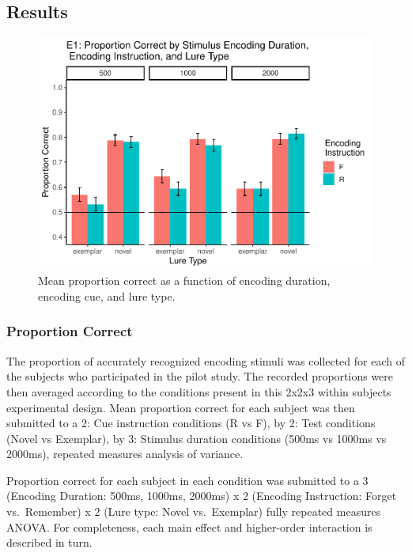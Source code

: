\documentclass[
  english,
  man,floatsintext]{apa6}
\begin{document}
\hypertarget{results}{%
\subsection{Results}\label{results}}

\begin{figure}
\centering
\includegraphics{honorsThesis_NEW_files/figure-latex/e1fig-1.pdf}
\caption{\label{fig:e1fig}Mean proportion correct as a function of encoding duration, encoding cue, and lure type.}
\end{figure}

\hypertarget{proportion-correct}{%
\subsubsection{Proportion Correct}\label{proportion-correct}}

The proportion of accurately recognized encoding stimuli was collected for each of the subjects who participated in the pilot study. The recorded proportions were then averaged according to the conditions present in this 2x2x3 within subjects experimental design. Mean proportion correct for each subject was then submitted to a 2: Cue instruction conditions (R vs F), by 2: Test conditions (Novel vs Exemplar), by 3: Stimulus duration conditions (500ms vs 1000ms vs 2000ms), repeated measures analysis of variance.

Proportion correct for each subject in each condition was submitted to a 3 (Encoding Duration: 500ms, 1000ms, 2000ms) x 2 (Encoding Instruction: Forget vs.~Remember) x 2 (Lure type: Novel vs.~Exemplar) fully repeated measures ANOVA. For completeness, each main effect and higher-order interaction is described in turn.
\end{document}
